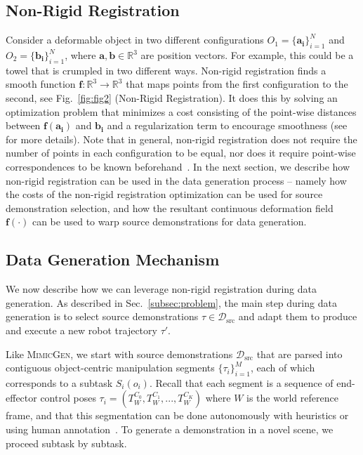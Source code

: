 \documentclass[letterpaper, 10 pt, conference]{ieeeconf}  %
\newcommand{\MimicGen}{\textsc{MimicGen}\xspace}
\begin{document}
\subsection{Non-Rigid Registration}
\label{subsec:nonrigid}


Consider a deformable object in two different configurations $O_1 = \{\mathbf{a_i}\}_{i=1}^{N}$ and $O_2 = \{\mathbf{b_i}\}_{i=1}^{N}$, where $\mathbf{a}, \mathbf{b} \in \mathbb{R}^3$ are position vectors. For example, this could be a towel that is crumpled in two different ways. Non-rigid registration finds a smooth function $\mathbf{f} : \mathbb{R}^3 \rightarrow \mathbb{R}^3$ that maps points from the first configuration to the second, see Fig.~\ref{fig:fig2} (Non-Rigid Registration). It does this by solving an optimization problem that minimizes a cost consisting of the point-wise distances between $\mathbf{f(a_i)}$ and $\mathbf{b_i}$ and a regularization term to encourage smoothness (see~\cite{schulman2016learning} for more details). Note that in general, non-rigid registration does not require the number of points in each configuration to be equal, nor does it require point-wise correspondences to be known beforehand~\cite{chui2003new, schulman2016learning}. In the next section, we describe how non-rigid registration can be used in the data generation process -- namely how the costs of the non-rigid registration optimization can be used for source demonstration selection, and how the resultant continuous deformation field $\mathbf{f}(\cdot)$ can be used to warp source demonstrations for data generation.





\subsection{Data Generation Mechanism}
\label{subsec:datagen_mechanism}


We now describe how we can leverage non-rigid registration during data generation. As described in Sec.~\ref{subsec:problem}, the main step during data generation is to select source demonstrations $\tau \in \mathcal{D}_{\text{src}}$ and adapt them to produce and execute a new robot trajectory $\tau'$.


Like \MimicGen, we start with source demonstrations $\mathcal{D}_{\text{src}}$ that are parsed into contiguous object-centric manipulation segments $\{\tau_i\}_{i=1}^M$, each of which corresponds to a subtask $S_i(o_i)$. Recall that each segment is a sequence of end-effector control poses $\tau_i = (T^{C_0}_W, T^{C_1}_W, ..., T^{C_K}_W)$ where $W$ is the world reference frame, and that this segmentation can be done autonomously with heuristics or using human annotation~\cite{mandlekar2023mimicgen}. To generate a demonstration in a novel scene, we proceed subtask by subtask.
\end{document}
